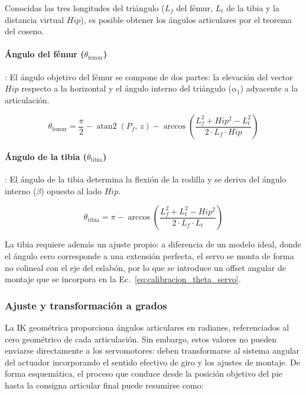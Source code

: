 Conocidas las tres longitudes del triángulo ($L_f$ del fémur, $L_t$ de la tibia y la distancia virtual $Hip$), es posible obtener los ángulos articulares por el teorema del coseno.

\paragraph{Ángulo del fémur ($\theta_{\text{femur}}$)}:
El ángulo objetivo del fémur se compone de dos partes: la elevación del vector $Hip$ respecto a la horizontal y el ángulo interno del triángulo ($\alpha_1$) adyacente a la articulación.

\vspace{-1\baselineskip}
\begin{equation}
    \theta_{\text{femur}} = \frac{\pi}{2} - \operatorname{atan2}(P_f,\, z) - \arccos\!\left(\frac{L_f^2 + Hip^2 - L_t^2}{2 \cdot L_f \cdot Hip}\right)
    \label{eq:theta_femur}
\end{equation}
\vspace{-1\baselineskip}

\paragraph{Ángulo de la tibia ($\theta_{\text{tibia}}$)}:
El ángulo de la tibia determina la flexión de la rodilla y se deriva del ángulo interno ($\beta$) opuesto al lado $Hip$.

\vspace{-1\baselineskip}
\begin{equation}
    \theta_{\text{tibia}} = \pi - \arccos\left(\frac{L_f^2 + L_t^2 - Hip^2}{2 \cdot L_f \cdot L_t}\right)
    \label{eq:theta_tibia}
\end{equation}
\vspace{-1\baselineskip}

La tibia requiere además un ajuste propio: a diferencia de un modelo ideal, donde el ángulo cero corresponde a una extensión perfecta, el servo se monta de forma no colineal con el eje del eslabón, por lo que se introduce un offset angular de montaje que se incorpora en la Ec.~\ref{eq:calibracion_theta_servo}.

\subsubsection{Ajuste y transformación a grados}
\label{subsec:ajuste_transformacion_grados}

La IK geométrica proporciona ángulos articulares en radianes, referenciados al cero geométrico de cada articulación. Sin embargo, estos valores no pueden enviarse directamente a los servomotores: deben transformarse al sistema angular del actuador incorporando el sentido efectivo de giro y los ajustes de montaje. De forma esquemática, el proceso que conduce desde la posición objetivo del pie hasta la consigna articular final puede resumirse como:

